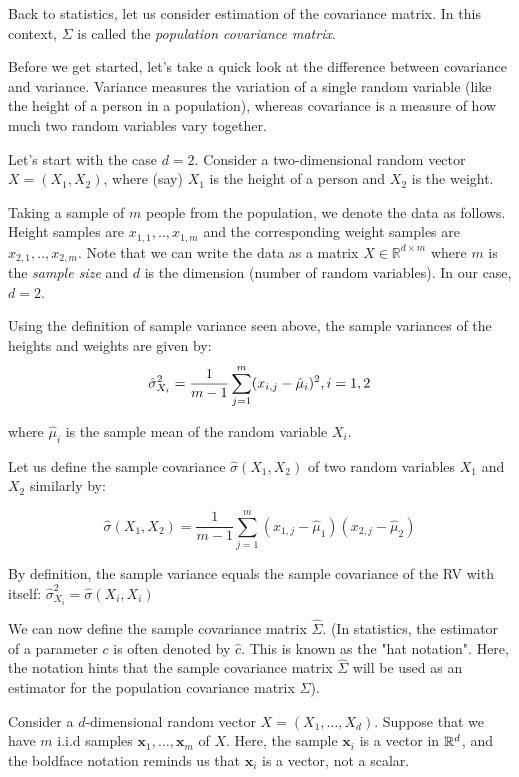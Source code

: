 {Back to statistics, let us consider estimation of the covariance matrix. In this context, $\Sigma$ is called the {\em population covariance matrix}. 

Before we get started, let's take a quick look at the difference between covariance and variance. 
Variance measures the variation of a single random variable (like the height of a person in a population), whereas covariance is a measure of how much two random variables vary together. 

Let's start with the case $d=2$. Consider a two-dimensional random vector $X=(X_1,X_2)$, where (say) $X_1$ is the height of a person and $X_2$ is the weight.

Taking a sample of $m$ people from the population, we denote the data as follows. Height samples are $x_{1,1},..,x_{1,m}$ and the corresponding weight samples are $x_{2,1},..,x_{2,m}$.
Note that we can write the data as a  matrix $X\in\mathbb{R}^{d\times m}$ where $m$ is the {\em sample size} and $d$ is the dimension (number of random variables).
In our case, $d=2$.

Using the definition of sample variance seen above, the sample variances of the heights and weights are given by:
$$\hat{\sigma}^2_{X_i} = \frac{1}{m-1} \sum^{m}_{j=1}(x_{i,j} - \hat{\mu}_i)^2, i=1,2 \\$$

where $\hat{\mu}_i$ is the sample mean of the random variable $X_i$.

Let us define the sample covariance 
$\hat{\sigma}\left(X_1,X_2\right)$ of  two random variables $X_{1}$ and $X_{2}$ similarly by:

$$\hat{\sigma}(X_1, X_2) = \frac{1}{m-1} \sum^{m}_{j=1}{(x_{1,j}-\hat{\mu}_1)(x_{2,j}-\hat{\mu}_2)}$$

By definition, the sample variance equals the sample covariance of the RV with itself: $ \hat{\sigma}^{2}_{X_i} = \hat{\sigma}\left(X_i,X_i\right)$  

We can now define the sample covariance matrix $\hat{\Sigma}$. 
(In statistics, the estimator of a parameter $c$ is often denoted by $\hat{c}$. This is known as the "hat notation".
Here, the notation hints that the sample covariance matrix $\hat{\Sigma}$ will be used as an estimator for the population covariance matrix $\Sigma$). 


Consider a $d$-dimensional random vector $X=(X_1,\ldots,X_d)$. Suppose that we have $m$ i.i.d samples $\mathbf{x}_1,\ldots,\mathbf{x}_m$ of $X$. Here, the sample $\mathbf{x}_i$ is a vector in $\mathbb{R}^d$, and the boldface notation reminds us that $\mathbf{x}_i$ is a vector, not a scalar.

}
